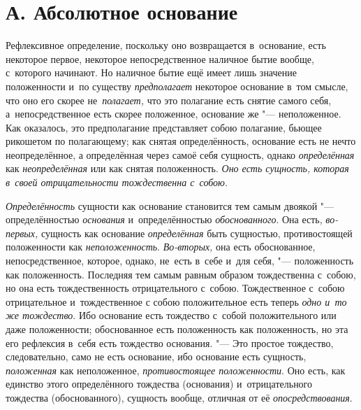 \section[А. Абсолютное основание]{А. Абсолютное основание}


Рефлексивное определение, поскольку оно возвращается в~основание, есть
некоторое первое, некоторое непосредственное наличное бытие вообще, с~которого
начинают. Но наличное бытие ещё имеет лишь значение положенности и~по существу
{\em предполагает} некоторое основание в~том смысле, что оно его скорее
не~{\em полагает,} что это полагание есть снятие самого себя,
а~непосредственное есть скорее положенное, основание же "--- неположенное. Как
оказалось, это предполагание представляет собою полагание, бьющее рикошетом по
полагающему; как снятая определённость, основание есть не нечто неопределённое,
а определённая через самоё себя сущность, однако {\em определённая}
как {\em неопределённая} или как снятая положенность.
{\em Оно есть сущность, которая в~своей отрицательности тождественна с~собою}.

{\em Определённость} сущности как основание становится тем самым двоякой "---
определённостью {\em основания} и~определённостью {\em обоснованного}. Она
есть, {\em во-первых,} сущность как основание {\em определённая} быть
сущностью, противостоящей положенности как {\em неположенность}.
{\em Во-вторых,} она есть обоснованное, непосредственное, которое, однако,
не~есть в~себе и~для себя, "--- положенность как положенность. Последняя тем
самым равным образом тождественна с~собою, но она есть тождественность
отрицательного с~собою. Тождественное с~собою отрицательное и~тождественное с
собою положительное есть теперь {\em одно и~то же тождество}. Ибо основание
есть тождество с~собой положительного или даже положенности; обоснованное есть
положенность как положенность, но эта его рефлексия в~себя есть тождество
основания. "--- Это простое тождество, следовательно, само не есть основание,
ибо основание есть сущность, {\em положенная} как неположенное,
{\em противостоящее положенности}. Оно есть, как единство этого определённого
тождества (основания) и~отрицательного тождества (обоснованного), сущность
вообще, отличная от её {\em опосредствования}.


